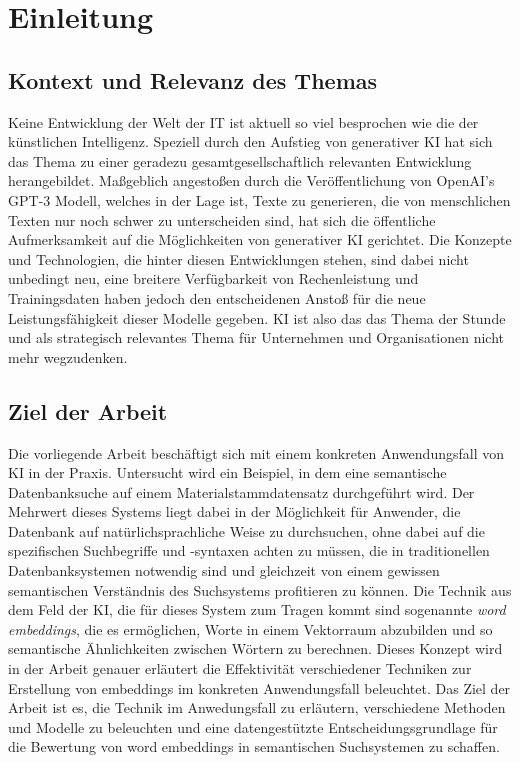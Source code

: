 \section{Einleitung}

\subsection{Kontext und Relevanz des Themas}
Keine Entwicklung der Welt der IT ist aktuell so viel besprochen wie die der künstlichen Intelligenz. Speziell durch den Aufstieg von generativer KI hat sich das Thema zu einer geradezu gesamtgesellschaftlich relevanten Entwicklung herangebildet.
Maßgeblich angestoßen durch die Veröffentlichung von OpenAI's GPT-3 Modell, welches in der Lage ist, Texte zu generieren, die von menschlichen Texten nur noch schwer zu unterscheiden sind, hat sich die öffentliche Aufmerksamkeit auf die Möglichkeiten von generativer KI gerichtet. Die Konzepte und Technologien, die hinter diesen Entwicklungen stehen, sind dabei nicht unbedingt neu, eine breitere Verfügbarkeit von Rechenleistung und Trainingsdaten haben jedoch den entscheidenen Anstoß für die neue Leistungsfähigkeit dieser Modelle gegeben.
KI ist also das das Thema der Stunde und als strategisch relevantes Thema für Unternehmen und Organisationen nicht mehr wegzudenken.

\subsection{Ziel der Arbeit}
Die vorliegende Arbeit beschäftigt sich mit einem konkreten Anwendungsfall von KI in der Praxis. Untersucht wird ein Beispiel, in dem eine semantische Datenbanksuche auf einem Materialstammdatensatz durchgeführt wird. Der Mehrwert dieses Systems liegt dabei in der Möglichkeit für Anwender, die Datenbank auf natürlichsprachliche Weise zu durchsuchen, ohne dabei auf die spezifischen Suchbegriffe und -syntaxen achten zu müssen, die in traditionellen Datenbanksystemen notwendig sind und gleichzeit von einem gewissen semantischen Verständnis des Suchsystems profitieren zu können.
Die Technik aus dem Feld der KI, die für dieses System zum Tragen kommt sind sogenannte \textit{word embeddings}, die es ermöglichen, Worte in einem Vektorraum abzubilden und so semantische Ähnlichkeiten zwischen Wörtern zu berechnen. Dieses Konzept wird in der Arbeit genauer erläutert die Effektivität verschiedener Techniken zur Erstellung von embeddings im konkreten Anwendungsfall beleuchtet.
Das Ziel der Arbeit ist es, die Technik im Anwedungsfall zu erläutern, verschiedene Methoden und Modelle zu beleuchten und eine datengestützte Entscheidungsgrundlage für die Bewertung von word embeddings in semantischen Suchsystemen zu schaffen.


